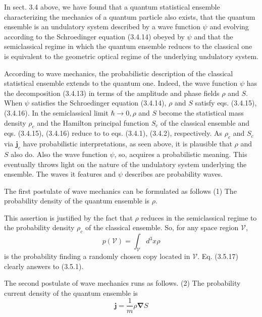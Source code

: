 \documentclass{article}
\begin{document}
In sect. 3.4 above, we have found that a quantum statistical ensemble characterizing the mechanics of a quantum particle also exists, that the quantum ensemble is an undulatory system described by a wave function $\psi$ and evolving according to the Schroedinger equation (3.4.14) obeyed by $\psi$ and that the semiclassical regime in which the quantum ensemble reduces to the classical one is equivalent to the geometric optical regime of the underlying undulatory system.

According to wave mechanics, the probabilistic description of the classical
statistical ensemble extends to the quantum one. Indeed, the wave function $\psi$ has the decomposition (3.4.13) in terms of the amplitude and phase fields $\rho$ and $S$. When $\psi$ satisfies the Schroedinger equation (3.4.14), $\rho$ and $S$ satisfy eqs. (3.4.15), (3.4.16). In the semiclassical limit $\hbar \rightarrow 0, \rho$ and $S$ become the statistical mass density $\rho_{c}$ and the Hamilton principal function $S_{c}$ of the classical ensemble and eqs. (3.4.15), (3.4.16) reduce to to eqs. (3.4.1), (3.4.2), respectively. As $\rho_{c}$ and $S_{c}$ via $\boldsymbol{j}_{c}$ have probabilistic interpretations, as seen above, it is plausible that $\rho$ and $S$ also do. Also the wave function $\psi$, so, acquires a probabilistic meaning. This eventually throws light on the nature of the undulatory system underlying the ensemble. The waves it features and $\psi$ describes are probability waves.

The first postulate of wave mechanics can be formulated as follows
(1) The probability density of the quantum ensemble is $\rho$.

This assertion is justified by the fact that $\rho$ reduces in the semiclassical regime to the probability density $\rho_{c}$ of the classical ensemble. So, for any space region $\mathcal{V}$,
$$
\begin{equation*}
p(\mathcal{V})=\int_{\mathcal{V}} d^{3} x \rho \tag{3.5.17}
\end{equation*}
$$
is the probability finding a randomly chosen copy located in $\mathcal{V}$. Eq. (3.5.17) clearly answers to (3.5.1).

The second postulate of wave mechanics runs as follows.
(2) The probability current density of the quantum ensemble is
$$
\begin{equation*}
\boldsymbol{j}=\frac{1}{m} \rho \boldsymbol{\nabla} S \tag{3.5.18}
\end{equation*}
$$
\end{document}
